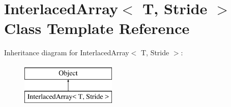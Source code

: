 \hypertarget{classInterlacedArray}{}\section{Interlaced\+Array$<$ T, Stride $>$ Class Template Reference}
\label{classInterlacedArray}
Inheritance diagram for Interlaced\+Array$<$ T, Stride $>$\+:\begin{figure}[H]
\begin{center}
\leavevmode
\includegraphics[height=2.000000cm]{classInterlacedArray}
\end{center}
\end{figure}
